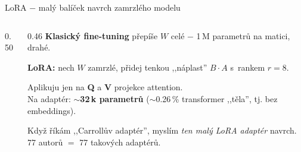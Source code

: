 \documentclass[aspectratio=169,10pt]{beamer}
\begin{document}
\begin{frame}[t]{LoRA $-$ malý balíček navrch zamrzlého modelu}
\begin{columns}[c,onlytextwidth]
\begin{column}{0.50\textwidth}
    \end{column}
    \begin{column}{0.46\textwidth}
      {\small\textbf{Klasický fine-tuning} přepíše $W$ celé $-$ 1\,M parametrů na matici, drahé.}\par\vspace{4mm}
      {\small\textbf{LoRA:} nech $W$ zamrzlé, přidej tenkou ,,náplast'' $B\!\cdot\!A$ s~rankem $r=8$.}\par\vspace{4mm}
      {\footnotesize Aplikuju jen na \textbf{Q} a \textbf{V} projekce attention.\\
      Na adaptér: $\sim$\textbf{32\,k parametrů} ($\sim$0.26\,\% transformer ,,těla'', tj. bez embeddings).}\par\vspace{4mm}
      \begin{aha}
      \small Když říkám ,,Carrollův adaptér'', myslím \emph{ten malý LoRA adaptér} navrch. 77 autorů $=$ 77 takových adaptérů.
      \end{aha}
    \end{column}
  \end{columns}
\end{frame}
\end{document}
